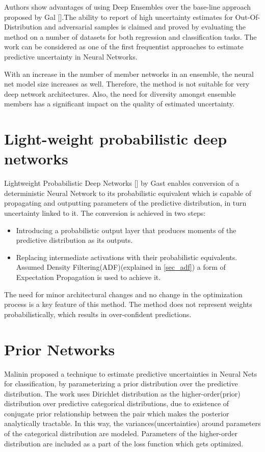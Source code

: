 	  Authors show advantages of using Deep Ensembles over the base-line approach proposed by Gal {\etal} [\cite{gal2016dropout}].The ability to report of high uncertainty estimates for Out-Of-Distribution and adversarial samples is claimed and proved by evaluating the method on a number of datasets for both regression and classification tasks. The work can be considered as one of the first frequentist approaches to estimate predictive uncertainty in Neural Networks.
	  
	  With an increase in the number of member networks in an ensemble, the neural net model size increases as well. Therefore, the method is not suitable for very deep network architectures. Also, the need for diversity amongst ensemble members has a significant impact on the quality of estimated uncertainty.  
	\section{Light-weight probabilistic deep networks}
	 Lightweight Probabilistic Deep Networks [\cite{gast2018lightweight}] by Gast {\etal} enables conversion of a deterministic Neural Network to its probabilistic equivalent which is capable of propagating and outputting parameters of the predictive distribution, in turn uncertainty linked to it. The conversion is achieved in two steps: 
	 \begin{itemize}
	 \item Introducing a probabilistic output layer that produces moments of the predictive distribution as its outputs.
	 \item Replacing intermediate activations with their probabilistic equivalents. Assumed Density Filtering(ADF)(explained in \ref{sec_adf}) a form of Expectation Propagation is used to achieve it. 
	 \end{itemize}
	 
	 The need for minor architectural changes and no change in the optimization process is a key feature of this method. The method does not represent weights probabilistically, which results in over-confident predictions.
	  
	\section{Prior Networks}
	Malinin  proposed a technique to estimate predictive uncertainties in Neural Nets for classification, by parameterizing a prior distribution over the predictive distribution. The work uses Dirichlet distribution as the higher-order(prior) distribution over predictive categorical distributions, due to existence of  conjugate prior relationship between the pair which makes the posterior analytically tractable. In this way, the variances(uncertainties) around parameters of the categorical distribution are modeled. Parameters of the higher-order distribution are included as a part of the loss function which gets optimized.
	
